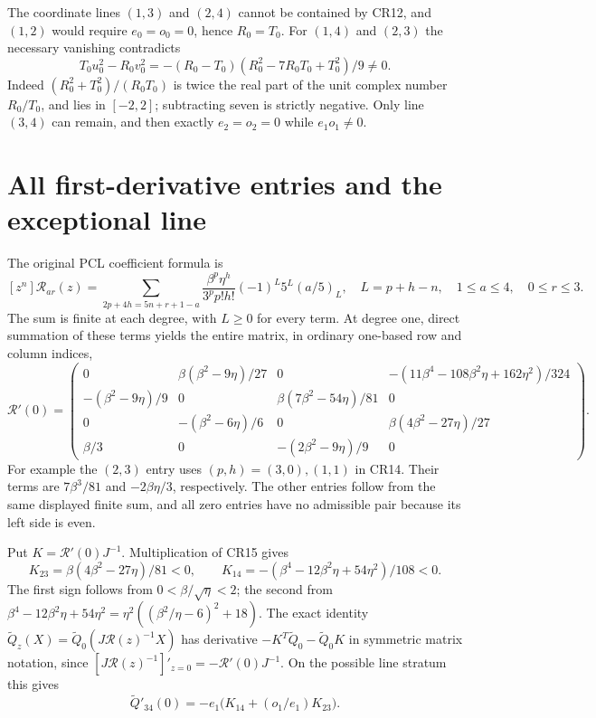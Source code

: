 \documentclass[11pt]{article}
\begin{document}
The coordinate lines $(1,3)$ and $(2,4)$ cannot be contained by
CR12, and $(1,2)$ would require $e_0=o_0=0$, hence $R_0=T_0$.
For $(1,4)$ and $(2,3)$ the necessary vanishing contradicts
\[
 T_0u_0^2-R_0v_0^2
  =-(R_0-T_0)(R_0^2-7R_0T_0+T_0^2)/9\ne0.                     \tag{CR13}
\]
Indeed $(R_0^2+T_0^2)/(R_0T_0)$ is twice the real part of the
unit complex number $R_0/T_0$, and lies in $[-2,2]$; subtracting
seven is strictly negative.  Only line $(3,4)$ can remain, and
then exactly $e_2=o_2=0$ while $e_1o_1\ne0$.

\section{All first-derivative entries and the exceptional line}
The original PCL coefficient formula is
\[
 [z^n]\mathcal R_{ar}(z)=
 \sum_{2p+4h=5n+r+1-a}
 \frac{\beta^p\eta^h}{3^p p!h!}(-1)^L5^L(a/5)_L,
 \quad L=p+h-n,\quad 1\le a\le4,\quad0\le r\le3.              \tag{CR14}
\]
The sum is finite at each degree, with $L\ge0$ for every term.
At degree one, direct summation of these terms yields the entire
matrix, in ordinary one-based row and column indices,
\[
 \mathcal R'(0)=
 \begin{pmatrix}
 0&\beta(\beta^2-9\eta)/27&0&
          -(11\beta^4-108\beta^2\eta+162\eta^2)/324\\
 -(\beta^2-9\eta)/9&0&\beta(7\beta^2-54\eta)/81&0\\
 0&-(\beta^2-6\eta)/6&0&\beta(4\beta^2-27\eta)/27\\
 \beta/3&0&-(2\beta^2-9\eta)/9&0
 \end{pmatrix}.                                                   \tag{CR15}
\]
For example the $(2,3)$ entry uses $(p,h)=(3,0),(1,1)$
in CR14.  Their terms are $7\beta^3/81$ and
$-2\beta\eta/3$, respectively.  The other entries follow from
the same displayed finite sum, and all zero entries have no
admissible pair because its left side is even.

Put $K=\mathcal R'(0)J^{-1}$.  Multiplication of CR15 gives
\[
 K_{23}=\beta(4\beta^2-27\eta)/81<0,\qquad
 K_{14}=-(\beta^4-12\beta^2\eta+54\eta^2)/108<0.                 \tag{CR16}
\]
The first sign follows from $0<\beta/\sqrt\eta<2$; the second
from $\beta^4-12\beta^2\eta+54\eta^2
=\eta^2((\beta^2/\eta-6)^2+18)$.
The exact identity
$\widetilde Q_z(X)=\widetilde Q_0(J\mathcal R(z)^{-1}X)$ has
derivative $-K^T\widetilde Q_0-\widetilde Q_0K$ in symmetric
matrix notation, since
$[J\mathcal R(z)^{-1}]'_{z=0}=-\mathcal R'(0)J^{-1}$.
On the possible line stratum this gives
\[
 \widetilde Q'_{34}(0)
       =-e_1\bigl(K_{14}+(o_1/e_1)K_{23}\bigr).                  \tag{CR17}
\]
\end{document}
